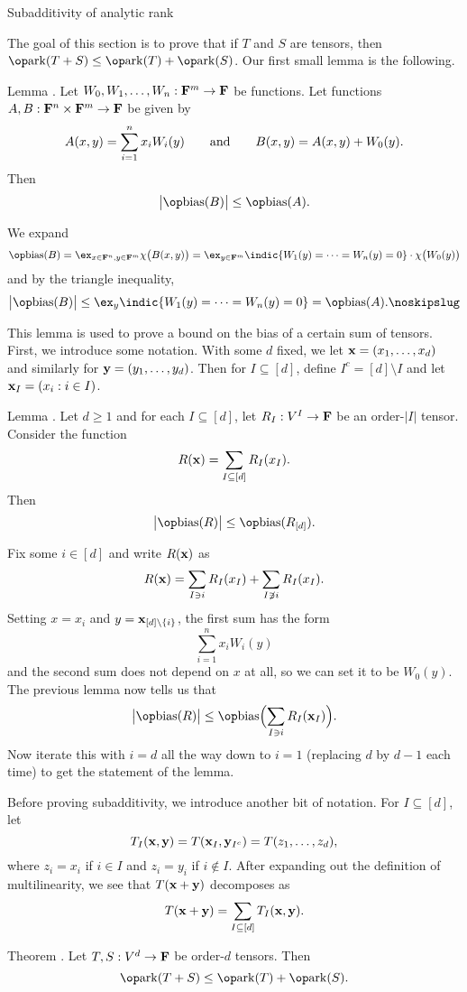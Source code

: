 \advsect Subadditivity of analytic rank

The goal of this section is to prove that if $T$ and $S$ are tensors, then $\ark(T+S)\le \ark(T)+\ark(S)$.
Our first small lemma is the following.

\proclaim Lemma \advthm. Let $W_0, W_1,\ldots,W_n : {\bf F}^m\to {\bf F}$ be functions. Let
functions $A,B : {\bf F}^n\times {\bf F}^m\to {\bf F}$ be given by
$$A(x,y) = \sum_{i=1}^n x_i W_i(y)\qquad\hbox{and}\qquad B(x,y) = A(x,y) + W_0(y).$$
Then
$$\bigl| \bias(B)\bigr| \le \bias(A).$$

\proof We expand
$$\bias(B) = \ex_{x\in \FF^n, y\in \FF^m} \chi\bigl(B(x,y)\bigr)
= \ex_{y\in \FF^m} \indic{W_1(y) = \cdots = W_n(y) = 0} \cdot \chi\bigl(W_0(y)\bigr)$$
and by the triangle inequality,
$$\bigl|\bias(B)\bigr| \le \ex_y \indic{W_1(y) = \cdots = W_n(y) = 0} = \bias(A).\noskipslug$$

This lemma is used to prove a bound on the bias of a certain sum of tensors.
First, we introduce some notation. With some $d$ fixed, we let ${\bf x} = (x_1,\ldots,x_d)$ and
similarly for ${\bf y} = (y_1,\ldots,y_d)$. Then for
$I\subseteq [d]$, define $I^c = [d]\setminus I$ and let ${\bf x}_I = (x_i : i\in I)$.

\edef\normbound{\the\thmcount}
\proclaim Lemma \advthm. Let $d\ge 1$ and for each $I\subseteq [d]$, let $R_I : V^I\to {\bf F}$
be an order-$|I|$ tensor. Consider the function
$$R({\bf x}) = \sum_{I\subseteq [d]} R_I(x_I).$$
Then
$$\bigl|\bias(R)\bigr| \le \bias(R_{[d]}).$$

\proof Fix some $i\in [d]$ and write $R({\bf x})$ as
$$R({\bf x}) = \sum_{I \ni i} R_I(x_I) + \sum_{I\not\ni i} R_I(x_I).$$
Setting $x = x_i$ and $y = {\bf x}_{[d]\setminus\{i\}}$, the first sum has the form
$$\sum_{i=1}^n x_iW_i(y)$$ and the second sum does not depend on $x$ at all, so we can set it
to be $W_0(y)$. The previous lemma now tells us that
$$\bigl|\bias(R)\bigr| \le \bias\Bigl(\sum_{I\ni i} R_I(\x_I)\Bigr).$$
Now iterate this with $i=d$ all the way down to $i=1$ (replacing $d$ by $d-1$ each time)
to get the statement of the lemma.\slug

Before proving subadditivity, we introduce another bit of notation. For $I\subseteq [d]$,
let
$$T_I({\bf x},{\bf y}) = T({\bf x}_I, {\bf y}_{I^c}) = T(z_1, \ldots, z_d),$$
where $z_i = x_i$ if $i\in I$ and $z_i = y_i$ if $i\notin I$. After expanding out the definition
of multilinearity, we see that $T({\bf x}+{\bf y})$ decomposes as
$$ T({\bf x}+{\bf y}) = \sum_{I\subseteq[d]} T_I({\bf x},{\bf y}).$$

\edef\subadditivity{\the\thmcount}
\proclaim Theorem \advthm. Let $T,S: V^d\to {\bf F}$ be order-$d$ tensors. Then
$$\ark(T+S) \le \ark(T) + \ark(S).$$

